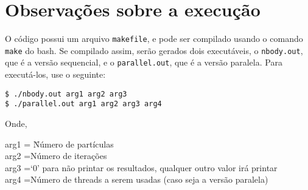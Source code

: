 \documentclass[a4paper, 12pt]{article}
\begin{document}

\section{Observações sobre a execução}

O código possui um arquivo \verb|makefile|, e pode ser compilado usando o
comando \verb|make| do bash. Se compilado assim, serão gerados dois executáveis,
o \verb|nbody.out|, que é a versão sequencial, e o \verb|parallel.out|, que é a
versão paralela. Para executá-los, use o seguinte:
\begin{verbatim}
$ ./nbody.out arg1 arg2 arg3
$ ./parallel.out arg1 arg2 arg3 arg4
\end{verbatim}
Onde,
\begin{tabbing}
    arg1 = \=Número de partículas\\
    arg2 =\>Número de iterações\\
    arg3 =\>`0' para não printar os resultados, qualquer outro valor irá printar\\
    arg4 =\>Número de threads a serem usadas (caso seja a versão paralela)\\
\end{tabbing}

\end{document}
